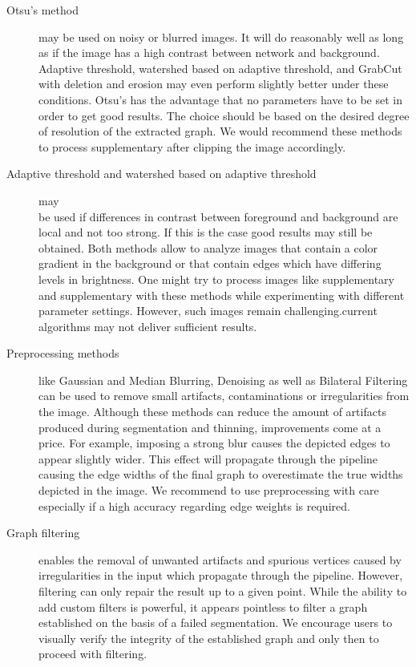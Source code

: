 	\begin{description}
	\item [Otsu's method] may be used on noisy or blurred images. It will do reasonably well as long as if the image has a high contrast between network and background. Adaptive threshold, watershed based on adaptive threshold, and GrabCut with deletion and erosion may even perform slightly better under these conditions. Otsu's has the advantage that no parameters have to be set in order to get good results. The choice should be based on the desired degree of resolution of the extracted graph. We would recommend these methods to process supplementary  after clipping the image accordingly.

	\item [Adaptive threshold and watershed based on adaptive threshold] may\\be used if differences in contrast between foreground and background are local and not too strong. If this is the case good results may still be obtained. Both methods allow to analyze images that contain a color gradient in the background or that contain edges which have differing levels in brightness. One might try to process images like supplementary  and supplementary  with these methods while experimenting with different parameter settings. However, such images remain challenging.\NEFIs current algorithms may not deliver sufficient results.

	\item [Preprocessing methods] like Gaussian and Median Blurring, Denoising as well as Bilateral Filtering can be used to remove small artifacts, contaminations or irregularities from the image. Although these methods can reduce the amount of artifacts produced during segmentation and thinning, improvements come at a price. For example, imposing a strong blur causes the depicted edges to appear slightly wider. This effect will propagate through the pipeline causing the edge widths of the final graph to overestimate the true widths depicted in the image. We recommend to use preprocessing with care especially if a high accuracy regarding edge weights is required.

	\item[Graph filtering] enables the removal of unwanted artifacts and spurious vertices caused by irregularities in the input which propagate through the pipeline. However, filtering can only repair the result up to a given point. While the ability to add custom filters is powerful, it appears pointless to filter a graph established on the basis of a failed segmentation. We encourage users to visually verify the integrity of the established graph and only then to proceed with filtering.
	\end{description}

